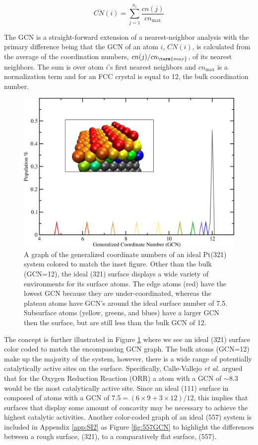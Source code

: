 \begin{equation}
  \overline{CN}(i) = \sum_{j=1}^{n_i}\frac{cn(j)}{cn_{\textrm{max}}}
  \label{eq:gcn}
\end{equation}

The GCN is a straight-forward extension of a nearest-neighbor analysis with the
primary difference being that the GCN of an atom $i$, $\overline{CN}(i)$,  is
calculated from the average of the coordination numbers, $cn(j)/cn_\term{max}$,
of its nearest neighbors.  The sum is over atom $i$'s first nearest neighbors
and $cn_\textrm{max}$ is a normalization term and for an FCC crystal is equal
to 12, the bulk coordination number.

\begin{figure}[p!]
  \includegraphics[width=\linewidth]{../figures/chap4/321_ideal_gcn.pdf}
  \caption{A graph of the generalized coordinate numbers of an ideal Pt(321)
system colored to match the inset figure. Other than the bulk (GCN=12), the
ideal (321) surface displays a wide variety of environments for its surface
atoms.  The edge atoms (red) have the lowest GCN because they are 
under-coordinated, whereas the plateau atoms have GCN's around the ideal
surface number of 7.5. Subsurface atoms (yellow, greens, and blues) have a
larger GCN then the surface, but are still less than the bulk GCN of 12.  }
\label{fig:ideal321GCN}
\end{figure}

The concept is further illustrated in Figure \ref{fig:ideal321GCN} where we see
an ideal  (321) surface color coded to match the encompassing GCN graph.
The bulk atoms (GCN=12) make up the majority of the system, however, there is a
wide range of potentially catalytically active sites on the surface.
Specifically, Calle-Vallejo {\em et al.} argued that for the Oxygen Reduction
Reaction (ORR) a  atom with a GCN of $\sim$8.3 would be the most
catalytically active site. Since an ideal (111) surface in composed of atoms
with a GCN of $7.5=(6\times9 + 3\times12)/12$, this implies that surfaces that
display some amount of concavity may be necessary to achieve the highest
catalytic activities. Another color-coded graph of an ideal  (557)
system is included in Appendix \ref{app:SI2} as Figure \ref{fig:557GCN} to
highlight the differences between a rough surface, (321), to a comparatively
flat surface, (557).

